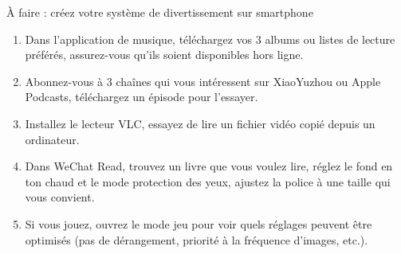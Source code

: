 \begin{tcbpractice}{À faire : créez votre système de divertissement sur smartphone}
\begin{enumerate}
  \item Dans l'application de musique, téléchargez vos 3 albums ou listes de lecture préférés, assurez-vous qu'ils soient disponibles hors ligne.
  \item Abonnez-vous à 3 chaînes qui vous intéressent sur XiaoYuzhou ou Apple Podcasts, téléchargez un épisode pour l'essayer.
  \item Installez le lecteur VLC, essayez de lire un fichier vidéo copié depuis un ordinateur.
  \item Dans WeChat Read, trouvez un livre que vous voulez lire, réglez le fond en ton chaud et le mode protection des yeux, ajustez la police à une taille qui vous convient.
  \item Si vous jouez, ouvrez le mode jeu pour voir quels réglages peuvent être optimisés (pas de dérangement, priorité à la fréquence d'images, etc.).
\end{enumerate}

\end{tcbpractice}
